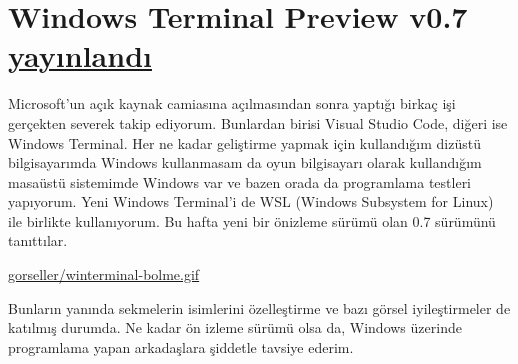 \documentclass[11pt]{article}
\begin{document}
\section{Windows Terminal Preview v0.7 \href{https://devblogs.microsoft.com/commandline/windows-terminal-preview-v0-7-release/}{yayınlandı}}
\label{sec:org05e6c39}
Microsoft'un açık kaynak camiasına açılmasından sonra yaptığı birkaç işi
gerçekten severek takip ediyorum. Bunlardan birisi Visual Studio Code, diğeri
ise Windows Terminal. Her ne kadar geliştirme yapmak için kullandığım dizüstü
bilgisayarımda Windows kullanmasam da oyun bilgisayarı olarak kullandığım
masaüstü sistemimde Windows var ve bazen orada da programlama testleri
yapıyorum. Yeni Windows Terminal'i de WSL (Windows Subsystem for Linux) ile
birlikte kullanıyorum. Bu hafta yeni bir önizleme sürümü olan 0.7 sürümünü
tanıttılar.

\url{gorseller/winterminal-bolme.gif}

Bunların yanında sekmelerin isimlerini özelleştirme ve bazı görsel
iyileştirmeler de katılmış durumda. Ne kadar ön izleme sürümü olsa da, Windows
üzerinde programlama yapan arkadaşlara şiddetle tavsiye ederim.
\end{document}
